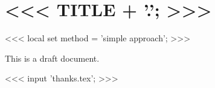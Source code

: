 \documentclass[a4paper,<<< FONT_SIZE; >>>]{report}
\newcommand{\beschreibung}[0]{a draft document}
\newcommand{\beschreibung}[0]{the final version}
\begin{document}
    \section{<<< TITLE + '.'; >>>}

    <<< local set method = 'simple approach'; >>>

    This is \beschreibung.

    <<< input 'thanks.tex'; >>>
\end{document}
